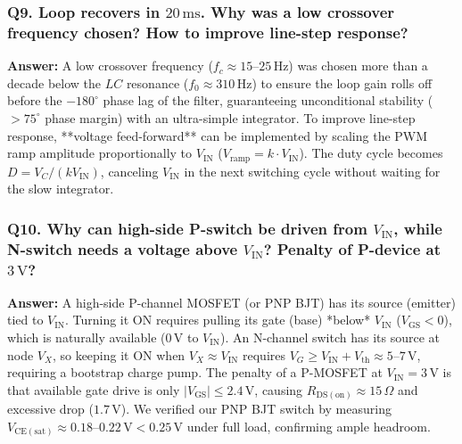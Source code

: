 \documentclass[11pt,a4paper]{article}
\begin{document}
\subsubsection*{Q9. Loop recovers in $20\,\mathrm{ms}$. Why was a low crossover frequency chosen? How to improve line-step response?}
\textbf{Answer:} A low crossover frequency ($f_c \approx 15\text{--}25\,\mathrm{Hz}$) was chosen more than a decade below the $LC$ resonance ($f_0 \approx 310\,\mathrm{Hz}$) to ensure the loop gain rolls off before the $-180^\circ$ phase lag of the filter, guaranteeing unconditional stability ($>75^\circ$ phase margin) with an ultra-simple integrator.
To improve line-step response, **voltage feed-forward** can be implemented by scaling the PWM ramp amplitude proportionally to $V_{\mathrm{IN}}$ ($V_{\mathrm{ramp}} = k \cdot V_{\mathrm{IN}}$). The duty cycle becomes $D = V_C / (k V_{\mathrm{IN}})$, canceling $V_{\mathrm{IN}}$ in the next switching cycle without waiting for the slow integrator.

\subsubsection*{Q10. Why can high-side P-switch be driven from $V_{\mathrm{IN}}$, while N-switch needs a voltage above $V_{\mathrm{IN}}$? Penalty of P-device at $3\,\mathrm{V}$?}
\textbf{Answer:} A high-side P-channel MOSFET (or PNP BJT) has its source (emitter) tied to $V_{\mathrm{IN}}$. Turning it ON requires pulling its gate (base) *below* $V_{\mathrm{IN}}$ ($V_{\mathrm{GS}} < 0$), which is naturally available ($0\,\mathrm{V}$ to $V_{\mathrm{IN}}$). An N-channel switch has its source at node $V_X$, so keeping it ON when $V_X \approx V_{\mathrm{IN}}$ requires $V_G \ge V_{\mathrm{IN}} + V_{\mathrm{th}} \approx 5\text{--}7\,\mathrm{V}$, requiring a bootstrap charge pump.
The penalty of a P-MOSFET at $V_{\mathrm{IN}} = 3\,\mathrm{V}$ is that available gate drive is only $|V_{\mathrm{GS}}| \le 2.4\,\mathrm{V}$, causing $R_{\mathrm{DS(on)}} \approx 15\,\Omega$ and excessive drop ($1.7\,\mathrm{V}$). We verified our PNP BJT switch by measuring $V_{\mathrm{CE(sat)}} \approx 0.18\text{--}0.22\,\mathrm{V} < 0.25\,\mathrm{V}$ under full load, confirming ample headroom.
\end{document}
